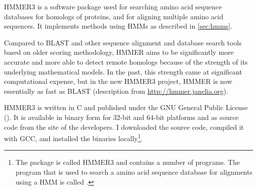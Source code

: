 HMMER3  \citep{eddy2011} is a software package used for searching amino acid
sequence databases for homologs of proteins, and for aligning multiple amino
acid sequences. It implements methods using HMMs as described in
\autoref{sec:hmms}.

Compared to BLAST and other sequence alignment and database search tools based
on older scoring methodology, HMMER aims to be significantly more accurate and
more able to detect remote homologs because of the strength of its underlying
mathematical models. In the past, this strength came at significant
computational expense, but in the new HMMER3 project, HMMER is now essentially
as fast as BLAST (description from \url{http://hmmer.janelia.org}).

HMMER3 is written in C and published under the GNU General Public License
(). It is available in binary
form for 32-bit and 64-bit platforms and as source code from the site of the
developers. I downloaded the source code, compiled it with GCC, and installed
the binaries locally\footnote{The package is called HMMER3 and contains a number
of programs. The program that is used to search a amino acid sequence database
for alignments using a HMM is called .}. 

